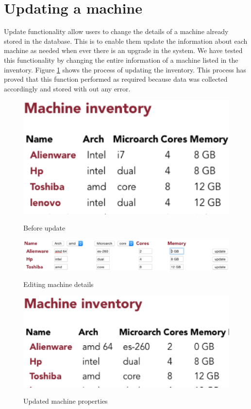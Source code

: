 \section*{Updating a machine}
Update functionality allow users to change the details of a machine already stored in the database. This is to enable them update the information about each machine as needed when ever there is an upgrade in the system. We have tested this functionality by changing the entire information of a machine listed in the inventory. Figure \ref{update}  shows the process of updating the inventory. This process has proved that this function performed as required because data was collected accordingly and stored with out any error.
\begin{figure}[h]
  \includegraphics[width=\linewidth]{update.eps}
  \label{update}
  \caption{Before update}
\end{figure}
\begin{figure}[h]
  \includegraphics[width=\linewidth]{change.eps}
  \label{change}
  \caption{Editing machine details}
\end{figure}
\begin{figure}[h]
  \includegraphics[width=\linewidth]{update2.eps}
  \label{update2}
  \caption{Updated machine properties}
\end{figure}
\pagebreak

